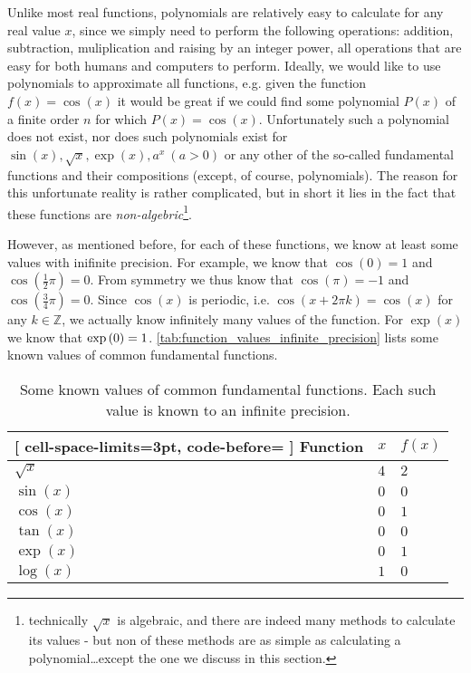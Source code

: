 Unlike most real functions, polynomials are relatively easy to calculate for any real value $x$, since we simply need to perform the following operations: addition, subtraction, muliplication and raising by an integer power, all operations that are easy for both humans and computers to perform. Ideally, we would like to use polynomials to approximate all functions, e.g. given the function $f(x) = \cos(x)$ it would be great if we could find some polynomial $P(x)$ of a finite order $n$ for which $P(x)=\cos(x)$. Unfortunately such a polynomial does not exist, nor does such polynomials exist for $\sin(x), \sqrt{x}, \exp(x), a^{x}\ \left(a>0\right)$ or any other of the so-called fundamental functions and their compositions (except, of course, polynomials). The reason for this unfortunate reality is rather complicated, but in short it lies in the fact that these functions are \textit{non-algebric}\footnote{technically $\sqrt{x}$ is algebraic, and there are indeed many methods to calculate its values - but non of these methods are as simple as calculating a polynomial\dots except the one we discuss in this section.}.

However, as mentioned before, for each of these functions, we know at least some values with inifinite precision. For example, we know that $\cos(0)=1$ and $\cos\left(\frac{1}{2}\pi\right)=0$. From symmetry we thus know that $\cos(\pi)=-1$ and $\cos\left(\frac{3}{4}\pi\right)=0$. Since $\cos(x)$ is periodic, i.e. $\cos\left(x+2\pi k\right)=\cos(x)$ for any $k\in\mathbb{Z}$, we actually know infinitely many values of the function. For $\exp(x)$ we know that $\exp\left(0\right)=1$. \autoref{tab:function_values_infinite_precision} lists some known values of common fundamental functions.

\begin{table}[htpb]
	\centering
	\caption{Some known values of common fundamental functions. Each such value is known to an infinite precision.}
	\label{tab:function_values_infinite_precision}
	\begin{NiceTabular}{lll}[
			cell-space-limits=3pt, code-before= 
		]
		\toprule
		\RowStyle{\bfseries} Function & $x$ & $f(x)$\\
		\midrule
    $\sqrt{x}$ & $4$ & $2$\\
    $\sin(x)$ & $0$ & $0$\\
    $\cos(x)$ & $0$ & $1$\\
    $\tan(x)$ & $0$ & $0$\\
    $\exp(x)$ & $0$ & $1$\\
    $\log(x)$ & $1$ & $0$\\
		\bottomrule
	\end{NiceTabular}
\end{table}

